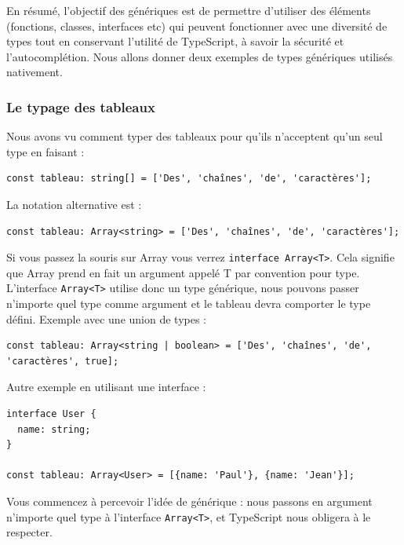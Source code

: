 \documentclass{article}
\begin{document}
En résumé, l'objectif des génériques est de permettre d'utiliser des éléments (fonctions, classes, interfaces etc) qui peuvent fonctionner avec une diversité de types tout en conservant l'utilité de {\color{monOrange}TypeScript}, à savoir la sécurité et l'autocomplétion. Nous allons donner deux exemples de types génériques utilisés nativement.

\subsubsection{Le typage des tableaux}
Nous avons vu comment typer des tableaux pour qu'ils n'acceptent qu'un seul type en faisant :
\begin{verbatim}
const tableau: string[] = ['Des', 'chaînes', 'de', 'caractères'];
\end{verbatim}
La notation alternative est :
\begin{verbatim}
const tableau: Array<string> = ['Des', 'chaînes', 'de', 'caractères'];
\end{verbatim}
Si vous passez la souris sur {\color{monOrange}Array} vous verrez {\tt interface Array<T>}. Cela signifie que {\color{monOrange}Array} prend en fait un argument appelé {\color{monOrange}T} par convention pour type. L'interface {\tt Array<T>} utilise donc un type générique, nous pouvons passer n'importe quel type comme argument et le tableau devra comporter le type défini. Exemple avec une union de types :
\begin{verbatim}
const tableau: Array<string | boolean> = ['Des', 'chaînes', 'de', 'caractères', true];
\end{verbatim}
Autre exemple en utilisant une {\color{monOrange}interface} :
\begin{verbatim}
interface User {
  name: string;
}

const tableau: Array<User> = [{name: 'Paul'}, {name: 'Jean'}];
\end{verbatim}
Vous commencez à percevoir l'idée de générique : nous passons en argument n'importe quel type à l'interface {\tt Array<T>}, et {\color{monOrange}TypeScript} nous obligera à le respecter.
\end{document}
